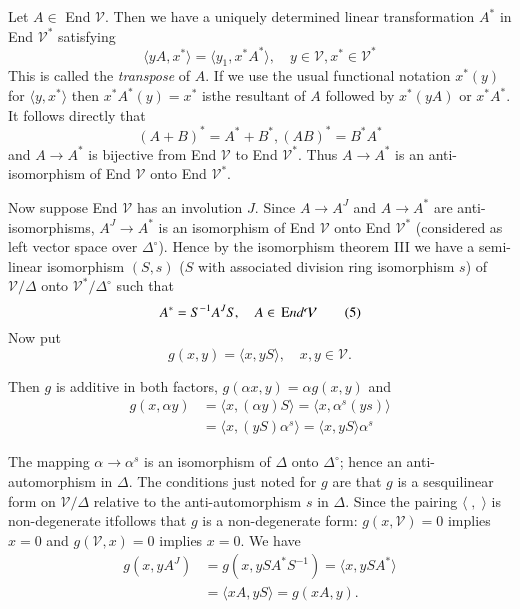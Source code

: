 \begin{enumerate}[I.]
Let $A\in$ End $\mathcal{V}$. Then we have a uniquely determined linear transformation $A^{\ast}$ in End $\mathcal{V}^{\ast}$ satisfying
\begin{equation*}
\langle yA,x^{\ast}\rangle=\langle y_1,x^{\ast}A^{\ast}\rangle,\quad 
y\in \mathcal{V}, x^{\ast}\in \mathcal{V}^{\ast}\tag{3}\label{c0:eq3}
\end{equation*}
This is called the {\em transpose} of $A$. If we use the usual
functional notation $x^{\ast}(y)$ for $\langle y,x^{\ast}\rangle$ then
$x^{\ast}A^{\ast}(y)=x^{\ast}$ is\pageoriginale the resultant of $A$
followed by $x^{\ast}(yA)$ or $x^{*}A^{*}$. It follows directly that 
\begin{equation*}
(A+B)^{\ast}=A^{\ast}+B^{\ast}, (AB)^{\ast}=B^{\ast}A^{\ast}\tag{4}\label{c0:eq4}
\end{equation*}
and $A \to A^{\ast}$ is bijective from End $\mathcal{V}$ to End $\mathcal{V}^{\ast}$. Thus $A\to A^{\ast}$ is an anti-isomorphism of End $\mathcal{V}$ onto End $\mathcal{V}^{\ast}$.

Now suppose End $\mathcal{V}$ has an involution $J$. Since $A\to A^{J}$ and $A\to A^{\ast}$ are anti-isomorphisms, $A^{J}\to A^{\ast}$ is an isomorphism of End $\mathcal{V}$ onto End $\mathcal{V}^{\ast}$ (considered as left vector space over $\Delta^{\circ}$). Hence by the isomorphism theorem III we have a semi-linear isomorphism $(S, s)$ ($S$ with associated division ring isomorphism $s$) of $\mathcal{V}/\Delta$ onto $\mathcal{V}^{\ast}/\Delta^{\circ}$ such that
\begin{equation*}
A^{\ast}=S^{-1}A^{J}S,\quad A\in \,{\text End} \mathcal{V}\tag{5}\label{c0:eq5}
\end{equation*}
Now put
\begin{equation*}
g(x,y)=\langle x, yS\rangle,\quad x, y\in \mathcal{V}.\tag{6}\label{c0:eq6}
\end{equation*}

Then $g$ is additive in both factors, $g(\alpha x, y)=\alpha g(x, y)$ and 
\begin{align*}
g(x, \alpha y)&=\langle x, (\alpha y)S \rangle=\langle x, \alpha^{s}(y s)\rangle\\
&=\langle x, (y S)\alpha^{s}\rangle=\langle x, y S \rangle \alpha^{s}
\end{align*}

The mapping $\alpha \to \alpha^{s}$ is an isomorphism of $\Delta$ onto $\Delta^{\circ}$; hence an anti-automorphism in $\Delta$. The conditions just noted for $g$ are that $g$ is a sesquilinear form on $\mathcal{V}/\Delta$ relative to the anti-automorphism $s$ in $\Delta$. Since the pairing $\langle\; ,\; \rangle$ is non-degenerate it\pageoriginale follows that $g$ is a non-degenerate form: $g(x,\mathcal{V})=0$ implies $x=0$ and $g(\mathcal{V}, x)=0$ implies $x=0$. We have
\begin{align*}
g(x,yA^{J})&=g(x,yS A^{\ast} S^{-1})=\langle x,y S A^{\ast}\rangle\\
&=\langle xA, y S\rangle=g(xA, y).
\end{align*}


\end{enumerate}
